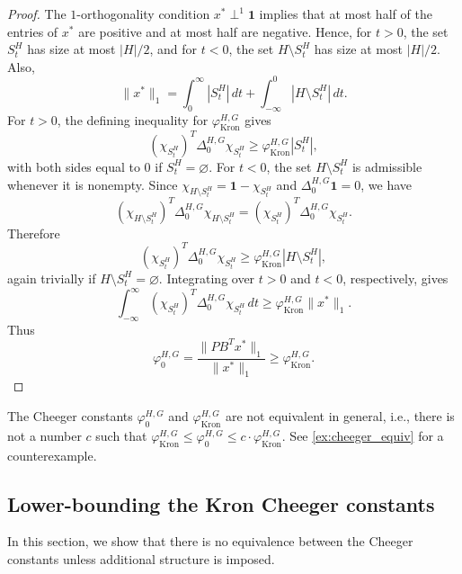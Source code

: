 \documentclass{article}
\newcommand{\one}{\mathbf{1}}
\begin{document}
\begin{proof}
The \(1\)-orthogonality condition \(x^*\perp^1\one\) implies that at most half of the entries of \(x^*\) are positive and at most half are negative. Hence, for \(t>0\), the set \(S_t^H\) has size at most \(|H|/2\), and for \(t<0\), the set \(H\setminus S_t^H\) has size at most \(|H|/2\). Also,
\[
\|x^*\|_1=\int_0^\infty |S_t^H|\,dt+\int_{-\infty}^0 |H\setminus S_t^H|\,dt.
\]
For \(t>0\), the defining inequality for \(\varphi_{\operatorname{Kron}}^{H,G}\) gives
\[
(\chi_{S_t^H})^T\Delta_0^{H,G}\chi_{S_t^H}\geq \varphi_{\operatorname{Kron}}^{H,G}|S_t^H|,
\]
with both sides equal to \(0\) if \(S_t^H=\varnothing\). For \(t<0\), the set \(H\setminus S_t^H\) is admissible whenever it is nonempty. Since \(\chi_{H\setminus S_t^H}=\one-\chi_{S_t^H}\) and \(\Delta_0^{H,G}\one=0\), we have
\[
(\chi_{H\setminus S_t^H})^T\Delta_0^{H,G}\chi_{H\setminus S_t^H}=(\chi_{S_t^H})^T\Delta_0^{H,G}\chi_{S_t^H}.
\]
Therefore
\[
(\chi_{S_t^H})^T\Delta_0^{H,G}\chi_{S_t^H}\geq \varphi_{\operatorname{Kron}}^{H,G}|H\setminus S_t^H|,
\]
again trivially if \(H\setminus S_t^H=\varnothing\). Integrating over \(t>0\) and \(t<0\), respectively, gives
\[
\int_{-\infty}^{\infty}(\chi_{S_t^H})^T\Delta_0^{H,G}\chi_{S_t^H}\,dt\geq \varphi_{\operatorname{Kron}}^{H,G}\|x^*\|_1.
\]
Thus
\[
\varphi_0^{H,G}=\frac{\|PB^Tx^*\|_1}{\|x^*\|_1}\geq \varphi_{\operatorname{Kron}}^{H,G}.
\]
\end{proof}
The Cheeger constants $\varphi_0^{H, G}$ and $\varphi_{\operatorname{Kron}}^{H, G}$ are not equivalent in general,
i.e., there is not a number $c$ such that $\varphi_{\operatorname{Kron}}^{H, G} \leq \varphi_0^{H, G}\leq c\cdot \varphi_{\operatorname{Kron}}^{H, G}$. See \cref{ex:cheeger_equiv} for a counterexample.
\subsection{Lower-bounding the Kron Cheeger constants}
In this section, we show that there is no equivalence between the Cheeger constants unless additional structure is imposed.
\end{document}
